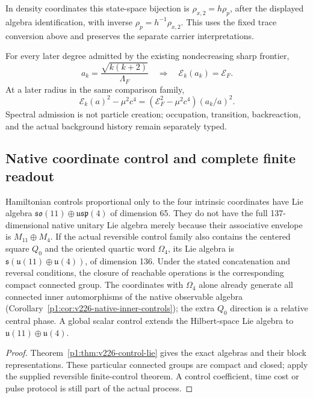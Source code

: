 \documentclass[12pt,a4paper]{article}
\begin{document}
In density coordinates this state-space bijection is
\(\rho_{x,2}=h\rho_p\), after the displayed algebra
identification, with inverse \(\rho_p=h^{-1}\rho_{x,2}\).
This uses the fixed trace conversion above and preserves the
separate carrier interpretations.

\begin{corollary}
\label{p4:cor:frontier-shell-entry-free-energy}
For every later degree admitted by the existing nondecreasing sharp frontier,
\[
 a_k=\frac{\sqrt{k(k+2)}}{\Lambda_F}
 \quad\Longrightarrow\quad
 \mathcal E_k(a_k)=\mathcal E_F.
\]
At a later radius in the same comparison family,
\[
 \mathcal E_k(a)^2-\mu^2c^4
 =(\mathcal E_F^2-\mu^2c^4)(a_k/a)^2.
\]
Spectral admission is not particle creation; occupation, transition,
backreaction, and the actual background history remain separately typed.
\end{corollary}



\subsection{Native coordinate control and complete finite readout}
\label{p4:sec:v226-control-readout}
\begin{corollary}
\label{p4:cor:v226-native-controls}
Hamiltonian controls proportional only to the four intrinsic coordinates
have Lie algebra $\mathfrak{so}(11)\oplus\mathfrak{usp}(4)$ of dimension 65.
They do not have the full 137-dimensional native unitary Lie algebra merely
because their associative envelope is $M_{11}\oplus M_4$.
If the actual reversible control family also contains the centered square
$Q_0$ and the oriented quartic word $\Omega_4$, its Lie algebra is
$\mathfrak{s}(\mathfrak u(11)\oplus\mathfrak u(4))$, of dimension 136.
Under the stated concatenation and reversal conditions, the closure of
reachable operations is the corresponding compact connected group.
The coordinates with $\Omega_4$ alone already generate all connected inner
automorphisms of the native observable algebra
(Corollary~\ref{p1:cor:v226-native-inner-controls}); the extra $Q_0$ direction
is a relative central phase. A global scalar control extends the Hilbert-space
Lie algebra to $\mathfrak u(11)\oplus\mathfrak u(4)$.
\end{corollary}
\begin{proof}
Theorem~\ref{p1:thm:v226-control-lie} gives the exact algebras and their
block representations. These particular connected groups are compact and
closed; apply the supplied reversible finite-control theorem. A control
coefficient, time cost or pulse protocol is still part of the actual process.
\end{proof}
\end{document}

